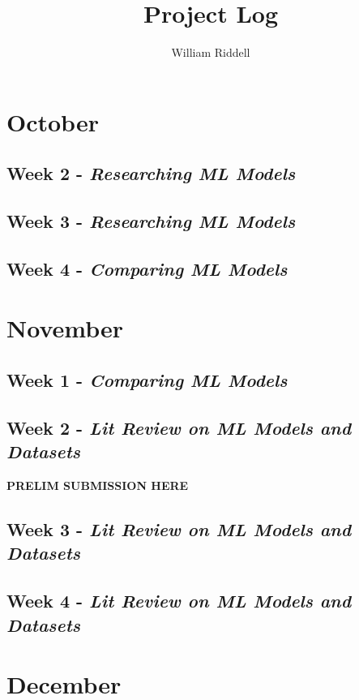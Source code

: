 \documentclass[12pt]{article}
\title{Project Log}
\author{William Riddell}
\begin{document}
\maketitle
\pagebreak
\tableofcontents

\section{October}

\subsection{Week 2
- \textit{Researching ML Models}}



\subsection{Week 3
- \textit{Researching ML Models}}


\subsection{Week 4
- \textit{Comparing ML Models}}




\section{November}

\subsection{Week 1
- \textit{Comparing ML Models}}


\subsection{Week 2
- \textit{Lit Review on ML Models and Datasets}}
\bf{PRELIM SUBMISSION HERE}

\subsection{Week 3
- \textit{Lit Review on ML Models and Datasets}}
\subsection{Week 4
- \textit{Lit Review on ML Models and Datasets}}

\section{December}
\end{document}
